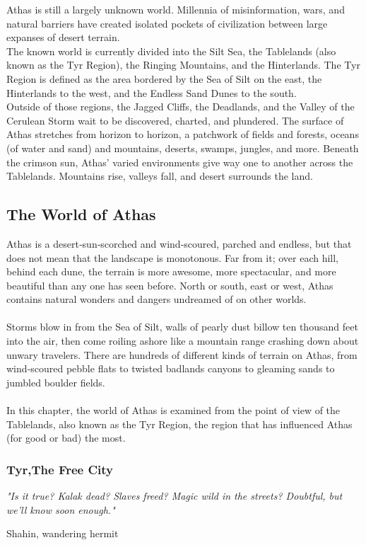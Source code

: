 \begin{multicols}{2}

Athas is still a largely unknown world. Millennia of
misinformation, wars, and natural barriers have created
isolated pockets of civilization between large expanses of
desert terrain.\\
The known world is currently divided into the Silt
Sea, the Tablelands (also known as the Tyr Region), the
Ringing Mountains, and the Hinterlands. The Tyr Region
is defined as the area bordered by the Sea of Silt on the
east, the Hinterlands to the west, and the Endless Sand
Dunes to the south.\\
Outside of those regions, the Jagged Cliffs, the
Deadlands, and the Valley of the Cerulean Storm wait to
be discovered, charted, and plundered. The surface of
Athas stretches from horizon to horizon, a patchwork of
fields and forests, oceans (of water and sand) and
mountains, deserts, swamps, jungles, and more. Beneath
the crimson sun, Athas’ varied environments give way
one to another across the Tablelands. Mountains rise,
valleys fall, and desert surrounds the land.\\

\subsection{The World of Athas}
Athas is a desert‐sun‐scorched and wind‐scoured,
parched and endless, but that does not mean that the
landscape is monotonous. Far from it; over each hill,
behind each dune, the terrain is more awesome, more
spectacular, and more beautiful than any one has seen
before. North or south, east or west, Athas contains
natural wonders and dangers undreamed of on other
worlds.\\
\\
Storms blow in from the Sea of Silt, walls of pearly
dust billow ten thousand feet into the air, then come
roiling ashore like a mountain range crashing down about
unwary travelers. There are hundreds of different kinds
of terrain on Athas, from wind‐scoured pebble flats to
twisted badlands canyons to gleaming sands to jumbled
boulder fields.\\
\\
In this chapter, the world of Athas is examined from
the point of view of the Tablelands, also known as the Tyr
Region, the region that has influenced Athas (for good or
bad) the most.\\

\subsubsection{Tyr,The Free City}
\epigraph{\textit{
"Is it true? Kalak dead? Slaves freed? Magic wild in the
    streets? Doubtful, but we'll know soon enough."} }
{ Shahin, wandering hermit }


\end{multicols}
